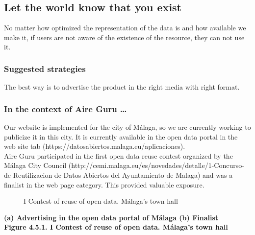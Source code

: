 \subsection{Let the world know that you exist}

No matter how optimized the representation of the data is and how available we make it, if users are not aware
of the existence of the resource, they can not use it.

\subsubsection*{Suggested strategies} 

The best way is to advertise the product in the right media with right format.

\subsubsection*{In the context of Aire Guru \ldots}

Our website is implemented for the city of Málaga, so we are currently working to publicize it in this city.
It is currently available in the open data portal in the web site tab (https://datosabiertos.malaga.eu/aplicaciones). \\

Aire Guru participated in the first open data reuse contest organized by the Málaga City Council (http://cemi.malaga.eu/es/novedades/detalle/1-Concurso-de-Reutilizacion-de-Datos-Abiertos-del-Ayuntamiento-de-Malaga)
and was a finalist in the web page category. This provided valuable exposure.

\begin{figure}[ht]
    \centering
    \hfill
    \caption{I Contest of reuse of open data. Málaga's town hall}
\end{figure}

\begin{center}
    \bf{ (a) Advertising in the open data portal of Málaga     (b) Finalist   \\
    Figure 4.5.1. I Contest of reuse of open data. Málaga's town hall}
\end{center}